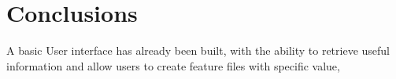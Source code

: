 \chapter{Conclusions}

A basic User interface has already been built, with the ability to retrieve useful information and allow users to create feature files with specific value,